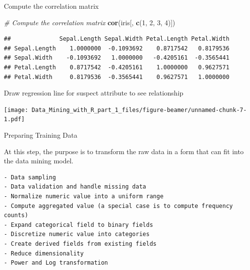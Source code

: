 \documentclass[ignorenonframetext,]{beamer}
\newenvironment{Shaded}{\begin{snugshade}}{\end{snugshade}}
\newcommand{\KeywordTok}[1]{\textcolor[rgb]{0.13,0.29,0.53}{\textbf{{#1}}}}
\newcommand{\DataTypeTok}[1]{\textcolor[rgb]{0.13,0.29,0.53}{{#1}}}
\newcommand{\DecValTok}[1]{\textcolor[rgb]{0.00,0.00,0.81}{{#1}}}
\newcommand{\StringTok}[1]{\textcolor[rgb]{0.31,0.60,0.02}{{#1}}}
\newcommand{\CommentTok}[1]{\textcolor[rgb]{0.56,0.35,0.01}{\textit{{#1}}}}
\newcommand{\NormalTok}[1]{{#1}}
\begin{document}
\begin{frame}[fragile]{}

Compute the correlation matrix

\begin{Shaded}
\begin{Highlighting}[]
\CommentTok{# Compute the correlation matrix}
\KeywordTok{cor}\NormalTok{(iris[, }\KeywordTok{c}\NormalTok{(}\DecValTok{1}\NormalTok{, }\DecValTok{2}\NormalTok{, }\DecValTok{3}\NormalTok{, }\DecValTok{4}\NormalTok{)])}
\end{Highlighting}
\end{Shaded}

\begin{verbatim}
##              Sepal.Length Sepal.Width Petal.Length Petal.Width
## Sepal.Length    1.0000000  -0.1093692    0.8717542   0.8179536
## Sepal.Width    -0.1093692   1.0000000   -0.4205161  -0.3565441
## Petal.Length    0.8717542  -0.4205161    1.0000000   0.9627571
## Petal.Width     0.8179536  -0.3565441    0.9627571   1.0000000
\end{verbatim}

\end{frame}

\begin{frame}[fragile]{}

Draw regression line for suspect attribute to see relationship

\begin{Shaded}
\end{Shaded}

\texttt{[image: Data\_Mining\_with\_R\_part\_1\_files/figure-beamer/unnamed-chunk-7-1.pdf]}

\end{frame}

\begin{frame}[fragile]{Preparing Training Data}

At this step, the purpose is to transform the raw data in a form that
can fit into the data mining model.

\begin{verbatim}
- Data sampling
- Data validation and handle missing data
- Normalize numeric value into a uniform range
- Compute aggregated value (a special case is to compute frequency counts)
- Expand categorical field to binary fields
- Discretize numeric value into categories
- Create derived fields from existing fields
- Reduce dimensionality
- Power and Log transformation
\end{verbatim}

\end{frame}
\end{document}
